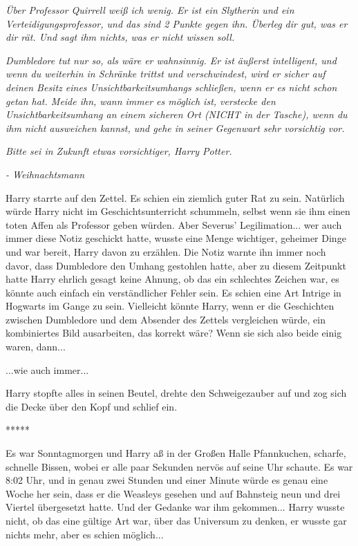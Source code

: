 \emph{Über Professor Quirrell weiß ich wenig. Er ist ein Slytherin und ein
Verteidigungsprofessor, und das sind 2 Punkte gegen ihn. Überleg dir gut, was er
dir rät. Und sagt ihm nichts, was er nicht wissen soll.}

\emph{Dumbledore tut nur so, als wäre er wahnsinnig. Er ist äußerst intelligent,
und wenn du weiterhin in Schränke trittst und verschwindest, wird er sicher auf
deinen Besitz eines Unsichtbarkeitsumhangs schließen, wenn er es nicht schon
getan hat. Meide ihn, wann immer es möglich ist, verstecke den
Unsichtbarkeitsumhang an einem sicheren Ort (NICHT in der Tasche), wenn du ihm
nicht ausweichen kannst, und gehe in seiner Gegenwart sehr vorsichtig vor.}

\emph{Bitte sei in Zukunft etwas vorsichtiger, Harry Potter.}

\emph{- Weihnachtsmann}

Harry starrte auf den Zettel. Es schien ein ziemlich guter Rat zu sein.
Natürlich würde Harry nicht im Geschichtsunterricht schummeln, selbst wenn sie
ihm einen toten Affen als Professor geben würden. Aber Severus' Legilimation...
wer auch immer diese Notiz geschickt hatte, wusste eine Menge wichtiger,
geheimer Dinge und war bereit, Harry davon zu erzählen. Die Notiz warnte ihn
immer noch davor, dass Dumbledore den Umhang gestohlen hatte, aber zu diesem
Zeitpunkt hatte Harry ehrlich gesagt keine Ahnung, ob das ein schlechtes Zeichen
war, es könnte auch einfach ein verständlicher Fehler sein. Es schien eine Art
Intrige in Hogwarts im Gange zu sein. Vielleicht könnte Harry, wenn er die
Geschichten zwischen Dumbledore und dem Absender des Zettels vergleichen würde,
ein kombiniertes Bild ausarbeiten, das korrekt wäre? Wenn sie sich also beide
einig waren, dann...

...wie auch immer...

Harry stopfte alles in seinen Beutel, drehte den Schweigezauber auf und zog sich
die Decke über den Kopf und schlief ein.

\begin{center}*****\end{center}

Es war Sonntagmorgen und Harry aß in der Großen Halle Pfannkuchen, scharfe,
schnelle Bissen, wobei er alle paar Sekunden nervös auf seine Uhr schaute. Es
war 8:02 Uhr, und in genau zwei Stunden und einer Minute würde es genau eine
Woche her sein, dass er die Weasleys gesehen und auf Bahnsteig neun und drei
Viertel übergesetzt hatte. Und der Gedanke war ihm gekommen... Harry wusste
nicht, ob das eine gültige Art war, über das Universum zu denken, er wusste gar
nichts mehr, aber es schien möglich...

